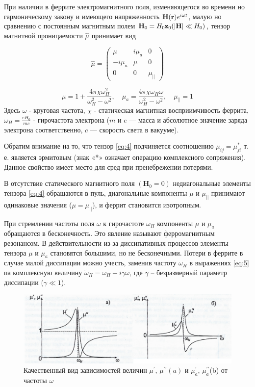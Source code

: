 При наличии в феррите электромагнитного поля, изменяющегося во времени но гармоническому закону и имеющего напряженность
$\textbf{H}(\textbf{r})e^{i\omega t}$, малую но сравнению с постоянным магнитным полем $\textbf{H}_0 =
H_0\textbf{z}_0(|\textbf{H}|\ll H_0)$, тензор магнитной проницаемости $\hat{\mu}$ принимает вид

\begin{equation}
    \hat{\mu}=\left(\begin{array}
        {ccc}{\mu} & {i\mu_{a}} & {0} \\
        {-i\mu_{a}} & {\mu} & {0} \\
        {0} & {0} & {\mu_{||}}
    \end{array}\right)
    \label{eq:4}
\end{equation}

\begin{equation}
    \mu=1+\frac{4 \pi \chi \omega_{H}^{2}}{\omega_{H}^{2}-\omega^{2}}, 
    \quad \mu_{a}=\frac{4 \pi \chi \omega_{H} \omega}{\omega_{H}^{2}-\omega^{2}}, 
    \quad \mu_{ \|}=1
    \label{eq:5}
\end{equation}
Здесь $\omega$ - круговая частота, $\chi$ - статическая магнитная восприимчивость феррита, $\omega_H = \frac{e H_0}{m
c}$ - гирочастота электрона ($m$ и $e$ — масса и абсолютное значение заряда электрона соответственно, $c$ — скорость света в вакууме).


Обратим внимание на то, что тензор \eqref{eq:4} подчиняется соотношению $\mu_{ij} = \mu_{ji}^*$ т. е. является эрмитовым (знак «*» означает
операцию комплексного сопряжения). Данное свойство имеет место для сред при пренебрежении потерями.

В отсутствие статического магнитного поля $(\textbf{H}_0 = 0)$ недиагональные элементы тензора \eqref{eq:4} обращаются в пуль, диагональные
компоненты $\mu$ и $\mu_{||}$ принимают одинаковые значения ($\mu=\mu_{||}$), и феррит становится изотропным.

При стремлении частоты поля $\omega$ к гирочастоте $\omega_H$ компоненты $\mu$ и $\mu_a$ обращаются в бесконечность. Это явление называют
ферромагнитным резонансом. В действительности из-за диссипативных процессов элементы тензора $\mu$ и $\mu_a$ становятся
большими, но не бесконечными. Потери в феррите в случае малой диссипации можно учесть, заменив
частоту $\omega_H$ в выражениях \eqref{eq:5} па комплексную величину $\tilde{\omega}_H = \omega_H+ i \gamma \omega$, где
$\gamma$ -- безразмерный параметр диссипации ($\gamma \ll 1$).

\begin{figure}[h!]
    \centering
    \includegraphics[width = 0.8\linewidth]{imgs/temp/001.png}
    \caption{Качественный вид зависимостей величин $\mu^{\prime}$, $\mu^{\prime \prime}(a)$ и 
    $\mu_{a}^{\prime}$, $\mu_{a}^{\prime \prime}$(b) от частоты $\omega$}
    \label{fig:1}
\end{figure}

